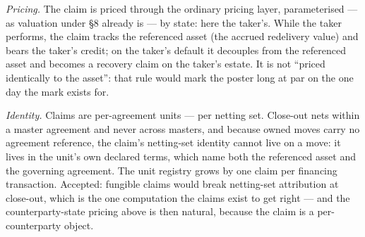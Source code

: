 \documentclass[11pt,a4paper]{article}
\begin{document}
\emph{Pricing.} The claim is priced through the ordinary pricing layer,
parameterised --- as valuation under \S8 already is --- by state: here the
taker's. While the taker performs, the claim tracks the referenced asset (the
accrued redelivery value) and bears the taker's credit; on the taker's default
it decouples from the referenced asset and becomes a recovery claim on the
taker's estate. It is not ``priced identically to the asset'': that rule would
mark the poster long at par on the one day the mark exists for.

\emph{Identity.} Claims are per-agreement units --- per netting set. Close-out
nets within a master agreement and never across masters, and because owned
moves carry no agreement reference, the claim's netting-set identity cannot
live on a move: it lives in the unit's own declared terms, which name both the
referenced asset and the governing agreement. The unit registry grows by one
claim per financing transaction. Accepted: fungible claims would break
netting-set attribution at close-out, which is the one computation the claims
exist to get right --- and the counterparty-state pricing above is then
natural, because the claim is a per-counterparty object.
\end{document}
